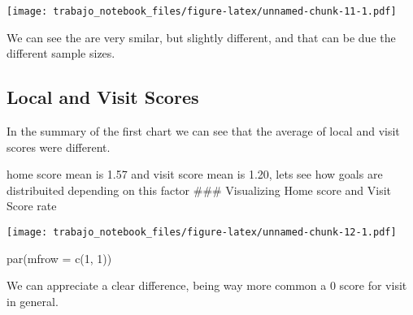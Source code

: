 \documentclass[
]{article}
\newenvironment{Shaded}{\begin{snugshade}}{\end{snugshade}}
\newcommand{\AttributeTok}[1]{\textcolor[rgb]{0.77,0.63,0.00}{#1}}
\newcommand{\DecValTok}[1]{\textcolor[rgb]{0.00,0.00,0.81}{#1}}
\newcommand{\FunctionTok}[1]{\textcolor[rgb]{0.00,0.00,0.00}{#1}}
\newcommand{\NormalTok}[1]{#1}
\newcommand{\SpecialCharTok}[1]{\textcolor[rgb]{0.00,0.00,0.00}{#1}}
\newcommand{\StringTok}[1]{\textcolor[rgb]{0.31,0.60,0.02}{#1}}
\begin{document}
\texttt{[image: trabajo\_notebook\_files/figure-latex/unnamed-chunk-11-1.pdf]}

We can see the are very smilar, but slightly different, and that can be
due the different sample sizes.

\hypertarget{local-and-visit-scores}{%
\subsection{Local and Visit Scores}\label{local-and-visit-scores}}

In the summary of the first chart we can see that the average of local
and visit scores were different.

home score mean is 1.57 and visit score mean is 1.20, lets see how goals
are distribuited depending on this factor \#\#\# Visualizing Home score
and Visit Score rate

\begin{Shaded}
\end{Shaded}

\texttt{[image: trabajo\_notebook\_files/figure-latex/unnamed-chunk-12-1.pdf]}

\begin{Shaded}
\begin{Highlighting}[]
\FunctionTok{par}\NormalTok{(}\AttributeTok{mfrow =} \FunctionTok{c}\NormalTok{(}\DecValTok{1}\NormalTok{, }\DecValTok{1}\NormalTok{))}
\end{Highlighting}
\end{Shaded}

We can appreciate a clear difference, being way more common a 0 score
for visit in general.
\end{document}
